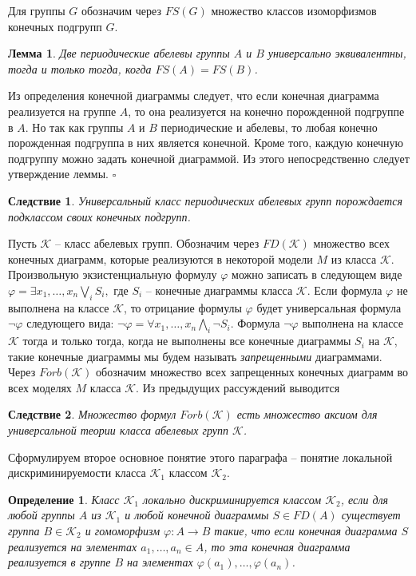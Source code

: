 \documentclass[a4paper,11pt,twoside]{article}
\newtheorem{lemma}{Лемма}[section]
\newtheorem{corollary}{Следствие}[section]
\newtheorem{definition}{Определение}[section]
\def\proof{{\noindent{\bf Доказательство.}} }
\def\K{{\mathcal{K}}}
\begin{document}
Для группы $G$ обозначим через $FS(G)$ множество классов изоморфизмов конечных подгрупп $G$.

\begin{lemma}\label{lemma:UnivEquivFS}
Две периодические абелевы группы $A$ и $B$ универсально эквивалентны, тогда и только тогда, когда $FS(A) = FS(B)$.
\end{lemma}
\proof Из определения конечной диаграммы следует, что если конечная диаграмма реализуется на группе $A$, то она реализуется на конечно порожденной подгруппе в $A$. Но так как группы $A$ и $B$ периодические и абелевы, то любая конечно порожденная подгруппа в них является конечной. Кроме того, каждую конечную подгруппу можно задать конечной диаграммой. Из этого непосредственно следует утверждение леммы. $\square$

\begin{corollary}\label{cor:ClassPerdiodicAbelinaGroup}
Универсальный класс периодических абелевых групп порождается подклассом своих конечных подгрупп.
\end{corollary}

Пусть $\K$ -- класс абелевых групп. Обозначим через $FD(\K)$ множество всех конечных диаграмм, которые реализуются в некоторой модели $M$ из класса $\K$. Произвольную экзистенциальную формулу $\varphi$ можно записать в следующем виде $\varphi = \exists x_1, \ldots, x_n \bigvee\limits_{i} S_i,$ где $S_i$ -- конечные диаграммы класса $\K$. Если формула $\varphi$ не выполнена на классе $\K$, то отрицание формулы $\varphi$ будет универсальная формула $\neg \varphi$ следующего вида: $\neg \varphi = \forall x_1, \ldots, x_n \bigwedge\limits_{i} \neg S_i$. Формула $\neg \varphi$ выполнена на классе $\K$ тогда и только тогда, когда не выполнены все конечные диаграммы $S_i$ на $\K$, такие конечные диаграммы мы будем называть \textit{запрещенными} диаграммами. Через $Forb(\K)$ обозначим множество всех запрещенных конечных диаграмм во всех моделях $M$ класса $\K$. Из предыдущих рассуждений выводится

\begin{corollary}
Множество формул $Forb(\K)$ есть множество аксиом для универсальной теории класса абелевых групп $\K$.
\end{corollary}


Сформулируем второе основное понятие этого параграфа -- понятие локальной дискриминируемости класса $\K_1$ классом $\K_2$.
\begin{definition}
Класс $\K_1$ локально дискриминируется классом $\K_2$, если для любой группы $A$ из $\K_1$ и любой конечной диаграммы $S \in FD(A)$ существует группа $B \in \K_2$ и гомоморфизм $\varphi: A \rightarrow B$ такие, что если конечная диаграмма $S$ реализуется на элементах $a_1, \ldots, a_n \in A$, то эта конечная диаграмма реализуется в группе $B$ на элементах $\varphi(a_1), \ldots, \varphi(a_n)$.
\end{definition}
\end{document}
